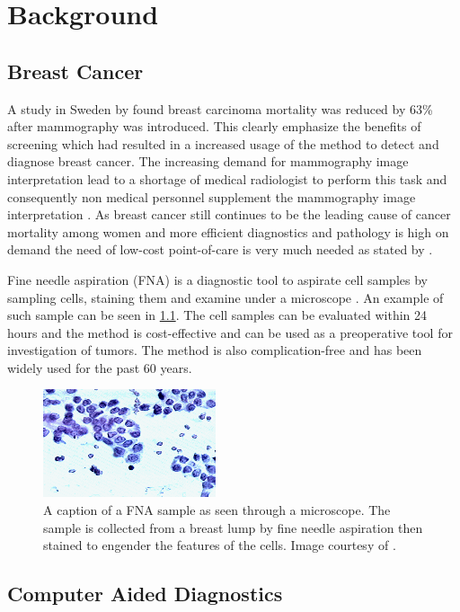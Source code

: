 \chapter{Background}


\section{Breast Cancer}

A study in Sweden by \textcite{tabar2001} found breast carcinoma mortality was reduced by 63\% after mammography was introduced. This clearly emphasize the benefits of screening which had resulted in a increased usage of the method to detect and diagnose breast cancer. The increasing demand for mammography image interpretation lead to a shortage of medical radiologist to perform this task and consequently non medical personnel supplement the mammography image interpretation \parencite{culpan2016}. As breast cancer still continues to be the leading cause of cancer mortality among women and more efficient diagnostics and pathology is high on demand the need of low-cost point-of-care is very much needed as stated by \textcite{martei2018}.

Fine needle aspiration (FNA) is a diagnostic tool to aspirate cell samples by sampling cells, staining them and examine under a microscope \parencite{FNA}. An example of such sample can be seen in \ref{fig:fna_nuclei}. The cell samples can be evaluated within 24 hours and the method is cost-effective and can be used as a preoperative tool for investigation of tumors. The method is also complication-free and has been widely used for the past 60 years.

\begin{figure}[ht!]
  \centering
  \includegraphics[]{images/fna_nuclei.png}
  \caption[]
  {\small A caption of a FNA sample as seen through a microscope. The sample is collected from a breast lump by fine needle aspiration then stained to engender the features of the cells. Image courtesy of \textcite{dua:2017}.}
  \label{fig:fna_nuclei}
\end{figure}


\section{Computer Aided Diagnostics}

